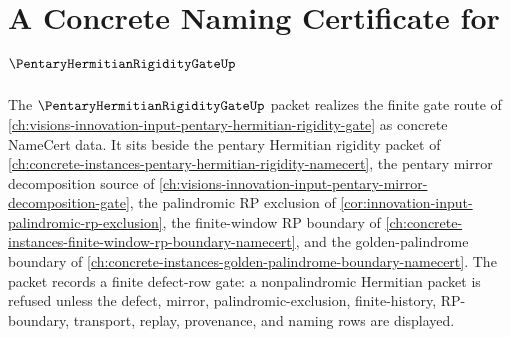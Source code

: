 \chapter{A Concrete Naming Certificate for $\PentaryHermitianRigidityGateUp$}
\label{ch:concrete-instances-pentary-hermitian-rigidity-gate-namecert}

The $\PentaryHermitianRigidityGateUp$ packet realizes the finite gate route of \autoref{ch:visions-innovation-input-pentary-hermitian-rigidity-gate} as concrete NameCert data. It sits beside the pentary Hermitian rigidity packet of \autoref{ch:concrete-instances-pentary-hermitian-rigidity-namecert}, the pentary mirror decomposition source of \autoref{ch:visions-innovation-input-pentary-mirror-decomposition-gate}, the palindromic RP exclusion of \autoref{cor:innovation-input-palindromic-rp-exclusion}, the finite-window RP boundary of \autoref{ch:concrete-instances-finite-window-rp-boundary-namecert}, and the golden-palindrome boundary of \autoref{ch:concrete-instances-golden-palindrome-boundary-namecert}. The packet records a finite defect-row gate: a nonpalindromic Hermitian packet is refused unless the defect, mirror, palindromic-exclusion, finite-history, RP-boundary, transport, replay, provenance, and naming rows are displayed.

